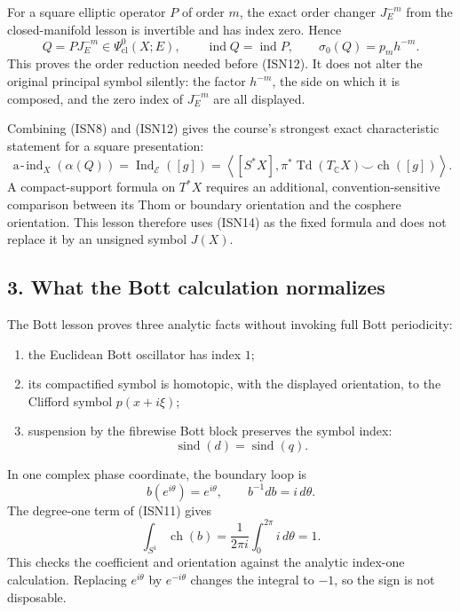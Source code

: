 \documentclass[
  11pt,
]{article}
\providecommand{\tightlist}{%
  \setlength{\itemsep}{0pt}\setlength{\parskip}{0pt}}
\begin{document}
For a square elliptic operator \(P\) of order \(m\), the exact order
changer \(J_E^{-m}\) from the closed-manifold lesson is invertible and
has index zero. Hence \[
 Q=PJ_E^{-m}\in\Psi^0_{\mathrm{cl}}(X;E),
 \qquad
 \operatorname{ind}Q=\operatorname{ind}P,
 \qquad
 \sigma_0(Q)=p_m h^{-m}.
 \tag{ISN13}
\] This proves the order reduction needed before (ISN12). It does not
alter the original principal symbol silently: the factor \(h^{-m}\), the
side on which it is composed, and the zero index of \(J_E^{-m}\) are all
displayed.

Combining (ISN8) and (ISN12) gives the course's strongest exact
characteristic statement for a square presentation: \[
 \operatorname{a\!-\!ind}_X(\alpha(Q))
 =
 \operatorname{Ind}_{\mathcal E}([g])
 =
 \left\langle
   [S^*X],
   \pi^*\operatorname{Td}(T_{\mathbb C}X)
      \smile\operatorname{ch}([g])
 \right\rangle.
 \tag{ISN14}
\] A compact-support formula on \(T^*X\) requires an additional,
convention-sensitive comparison between its Thom or boundary orientation
and the cosphere orientation. This lesson therefore uses (ISN14) as the
fixed formula and does not replace it by an unsigned symbol \(J(X)\).

\subsection{3. What the Bott calculation
normalizes}\label{what-the-bott-calculation-normalizes}

The Bott lesson proves three analytic facts without invoking full Bott
periodicity:

\begin{enumerate}
\def\labelenumi{\arabic{enumi}.}
\tightlist
\item
  the Euclidean Bott oscillator has index \(1\);
\item
  its compactified symbol is homotopic, with the displayed orientation,
  to the Clifford symbol \(p(x+i\xi)\);
\item
  suspension by the fibrewise Bott block preserves the symbol index: \[
   \operatorname{sind}(d)=\operatorname{sind}(q).
   \tag{ISN15}
   \]
\end{enumerate}

In one complex phase coordinate, the boundary loop is \[
 b(e^{i\theta})=e^{i\theta},
 \qquad
 b^{-1}db=i\,d\theta.
 \tag{ISN16}
\] The degree-one term of (ISN11) gives \[
 \int_{S^1}\operatorname{ch}(b)
 =
 \frac{1}{2\pi i}\int_0^{2\pi} i\,d\theta
 =1.
 \tag{ISN17}
\] This checks the coefficient and orientation against the analytic
index-one calculation. Replacing \(e^{i\theta}\) by \(e^{-i\theta}\)
changes the integral to \(-1\), so the sign is not disposable.
\end{document}
